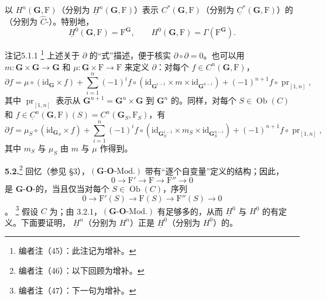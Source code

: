 以 $H^n(\mathbf G,\mathrm F)$（分别为 $\underline H^n(\mathbf G,\mathrm F)$）表示 $C^*(\mathbf G,\mathrm F)$（分别为 $\underline C^*(\mathbf G,\mathrm F)$）的（分别为 $\widehat C$-）。特别地，
\[
\underline H^0(\mathbf G,\mathrm F)=\mathrm F^{\mathbf G},\qquad H^0(\mathbf G,\mathrm F)=\Gamma(\mathrm F^{\mathbf G}).
\]
\begin{SGAresult}{注记}{5.1.1}
\footnote{编者注（45）：此注记为增补。} 上述关于 $\partial$ 的“式”描述，便于核实 $\partial\circ\partial=0$。也可以用 $m:\mathbf G\times\mathbf G\to\mathbf G$ 和 $\mu:\mathbf G\times\mathrm F\to\mathrm F$ 来定义 $\partial$：对每个 $f\in C^n(\mathbf G,\mathrm F)$，
\[
\partial f=\mu\circ(\mathrm{id}_{\mathbf G}\times f)+\sum_{i=1}^n(-1)^if\circ(\mathrm{id}_{\mathbf G^{i-1}}\times m\times\mathrm{id}_{\mathbf G^{n-i}})+(-1)^{n+1}f\circ\operatorname{pr}_{[1,n]},
\]
其中 $\operatorname{pr}_{[1,n]}$ 表示从 $\mathbf G^{n+1}=\mathbf G^n\times\mathbf G$ 到 $\mathbf G^n$ 的。同样，对每个 $S\in\operatorname{Ob}(C)$ 和 $f\in\underline C^n(\mathbf G,\mathrm F)(S)=C^n(\mathbf G_S,\mathrm F_S)$，有
\[
\partial f=\mu_S\circ(\mathrm{id}_{\mathbf G_S}\times f)+\sum_{i=1}^n(-1)^if\circ(\mathrm{id}_{\mathbf G_S^{i-1}}\times m_S\times\mathrm{id}_{\mathbf G_S^{n-i}})+(-1)^{n+1}f\circ\operatorname{pr}_{[1,n]},
\]
其中 $m_S$ 与 $\mu_S$ 由 $m$ 与 $\mu$ 作得到。
\end{SGAresult}

\textbf{5.2.}\footnote{编者注（46）：以下回顾为增补。} 回忆（参见 §3），$(\mathbf G\text{-}\mathbf O\text{-}\mathrm{Mod.})$ 带有“逐个自变量”定义的结构；因此，
\[
0\longrightarrow\mathrm F'\longrightarrow\mathrm F\longrightarrow\mathrm F''\longrightarrow0
\]
是 $\mathbf G$-$\mathbf O$-的，当且仅当对每个 $S\in\operatorname{Ob}(C)$，序列
\[
0\longrightarrow\mathrm F'(S)\longrightarrow\mathrm F(S)\longrightarrow\mathrm F''(S)\longrightarrow0
\]
。
\footnote{编者注（47）：下一句为增补。} 假设 $C$ 为；由 3.2.1，$(\mathbf G\text{-}\mathbf O\text{-}\mathrm{Mod.})$ 有足够多的，从而 $\underline H^0$ 与 $H^0$ 的有定义。下面要证明， $\underline H^n$（分别为 $H^n$）正是 $\underline H^0$（分别为 $H^0$）的。

